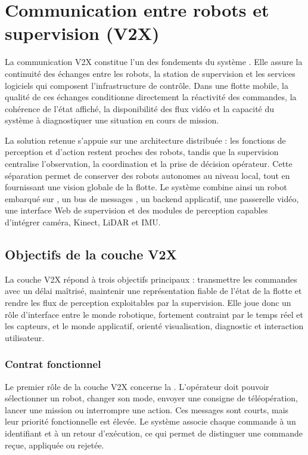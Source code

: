 \chapter{Communication entre robots et supervision (V2X)}
\label{chap:v2x}

La communication V2X constitue l'un des fondements du système . Elle assure la continuité des échanges entre les robots, la station de supervision et les services logiciels qui composent l'infrastructure de contrôle. Dans une flotte mobile, la qualité de ces échanges conditionne directement la réactivité des commandes, la cohérence de l'état affiché, la disponibilité des flux vidéo et la capacité du système à diagnostiquer une situation en cours de mission.

La solution retenue s'appuie sur une architecture distribuée : les fonctions de perception et d'action restent proches des robots, tandis que la supervision centralise l'observation, la coordination et la prise de décision opérateur. Cette séparation permet de conserver des robots autonomes au niveau local, tout en fournissant une vision globale de la flotte. Le système combine ainsi un robot embarqué sur , un bus de messages , un backend applicatif, une passerelle vidéo, une interface Web de supervision et des modules de perception capables d'intégrer caméra, Kinect, LiDAR et IMU.

\section{Objectifs de la couche V2X}

La couche V2X répond à trois objectifs principaux : transmettre les commandes avec un délai maîtrisé, maintenir une représentation fiable de l'état de la flotte et rendre les flux de perception exploitables par la supervision. Elle joue donc un rôle d'interface entre le monde robotique, fortement contraint par le temps réel et les capteurs, et le monde applicatif, orienté visualisation, diagnostic et interaction utilisateur.

\subsection{Contrat fonctionnel}

Le premier rôle de la couche V2X concerne la . L'opérateur doit pouvoir sélectionner un robot, changer son mode, envoyer une consigne de téléopération, lancer une mission ou interrompre une action. Ces messages sont courts, mais leur priorité fonctionnelle est élevée. Le système associe chaque commande à un identifiant et à un retour d'exécution, ce qui permet de distinguer une commande reçue, appliquée ou rejetée.


